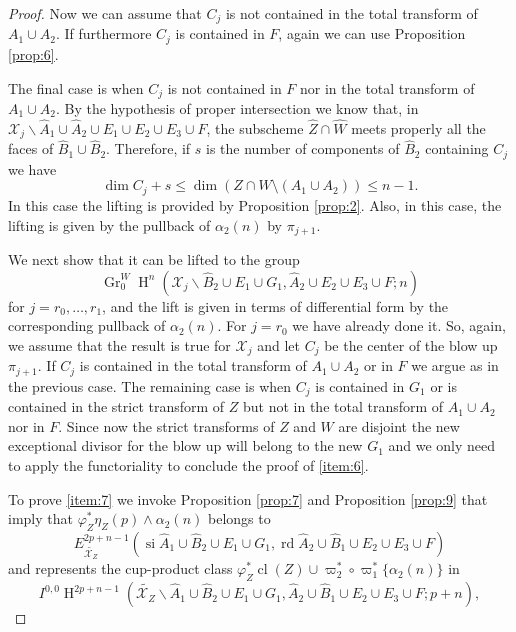 \documentclass[11pt,a4paper]{amsart}
\newcommand{\caX}{\mathcal{X}}
\DeclareMathOperator {\Gr} {Gr}
\DeclareMathOperator{\si}{si}
\DeclareMathOperator{\rd}{rd}
\DeclareMathOperator {\cl}{cl}
\DeclareMathOperator{\rH}{H}
\numberwithin{equation}{section}
\theoremstyle{plain}
\theoremstyle{definition}
\begin{document}
\begin{proof}
   Now we can assume that $C_{j}$ is not contained in the total
   transform of $A_{1}\cup A_{2}$. If furthermore $C_{j}$ is contained
   in $F$, again we can use Proposition \ref{prop:6}.

   The final case is when $C_{j}$ is not contained in $F$ nor in the
   total transform of $A_{1}\cup A_{2}$. By the hypothesis of proper
   intersection we know that, in $\caX_{j}\smallsetminus \widehat
   A_{1}\cup \widehat A_{2}\cup E_{1}\cup E_{2}\cup E_{3}\cup F$, the
   subscheme $\widehat Z\cap \widehat W$ meets properly all the faces
   of $\widehat B_{1}\cup \widehat B_{2}$. Therefore, if $s$ is the
   number of components of $\widehat B_{2}$ containing $C_{j}$ we
   have
   \begin{displaymath}
     \dim C_{j} + s \le \dim (Z\cap W\setminus (A_{1}\cup A_{2}))\le n-1. 
   \end{displaymath}
   In this case the lifting is provided by Proposition
   \ref{prop:2}. Also, in this 
   case, the lifting is given by the
   pullback of $\alpha_{2}(n)$ by $\pi_{j+1}$.

   We next show that it can be lifted to the group
   \begin{displaymath}
     \Gr_{0}^{W}\rH^{n}(\caX_{j}\smallsetminus \widehat B_{2}\cup
     E_{1}\cup G_1, \widehat A_{2}\cup E_{2}\cup E_{3}\cup F; n)
   \end{displaymath}
   for $j=r_0,\dots, r_{1}$, and the lift is given in terms of
   differential form by the corresponding pullback of
   $\alpha_{2}(n)$. For $j=r_0$ we have already done it.  So, again, we
   assume that the result is true 
   for $\caX_{j}$ and let $C_{j}$ be the center of the blow up $\pi
   _{j+1}$. If $C_j$  is contained in the total transform of $A_1\cup
   A_2$ or in $F$ we argue as in the previous case. The remaining case is when
   $C_j$ is contained in $G_1$ or is contained in the strict transform of $Z$ but not in the
   total transform of $A_1\cup A_2$ nor in $F$. Since now the strict transforms of
   $Z$ and $W$ are disjoint the new exceptional divisor for the blow
   up will belong to the new $G_1$  and we only need to apply the
   functoriality to conclude the proof of \ref{item:6}.

   To prove \ref{item:7} we invoke Proposition \ref{prop:7} and
   Proposition \ref{prop:9} that
   imply that $\varphi_{Z}^{\ast}\eta_Z(p)\wedge \alpha _2(n)$
  belongs to
  \begin{displaymath}
    E^{2p+n-1}_{\widetilde {\caX_{Z}}}(\si \widehat A_1\cup
    \widehat B_2\cup E_1\cup G_1   , \rd \widehat A_2\cup
    \widehat B_1\cup E_2\cup E_3\cup F)
  \end{displaymath}
  and  represents the cup-product class
  $\varphi_{Z}^{\ast}\cl(Z)\cup \varpi _2^\ast\circ \varpi _1^\ast
  \{\alpha_2(n)\}$ in
  \begin{displaymath}
     I^{0,0}\rH^{2p+n-1}(\widetilde {\caX_{Z}}\smallsetminus \widehat A_1\cup
    \widehat B_2\cup E_1\cup G_1   , \widehat A_2\cup
    \widehat B_1\cup E_2\cup E_3\cup F;p+n),
  \end{displaymath}



\end{proof}
\end{document}
